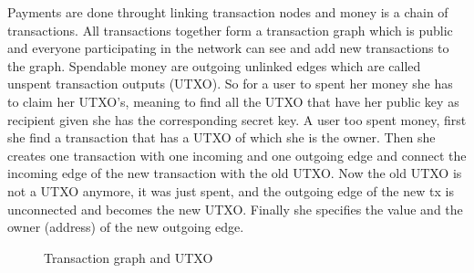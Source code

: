 Payments are done throught linking transaction nodes and money is a chain of transactions. All transactions together form a transaction graph which is public and everyone participating in
the network can see and add new transactions to the graph. Spendable money are outgoing unlinked edges which are called unspent transaction outputs (UTXO). So for a user to spent her money
she has to claim her UTXO's, meaning to find all the UTXO that have her public key as recipient given she has the corresponding secret key. A user too spent money, first she find a transaction
that has a UTXO of which she is the owner. Then she creates one transaction with one incoming and one outgoing edge and connect the incoming edge of the new transaction with the old UTXO.
Now the old UTXO is not a UTXO anymore, it was just spent, and the outgoing edge of the new tx is unconnected and becomes the new UTXO. Finally she specifies the value and the owner (address)
of the new outgoing edge.


\begin{figure}[ht!]
    \centering
  \caption{Transaction graph and UTXO}
  \label{fig:bl_utxo}
\end{figure}

